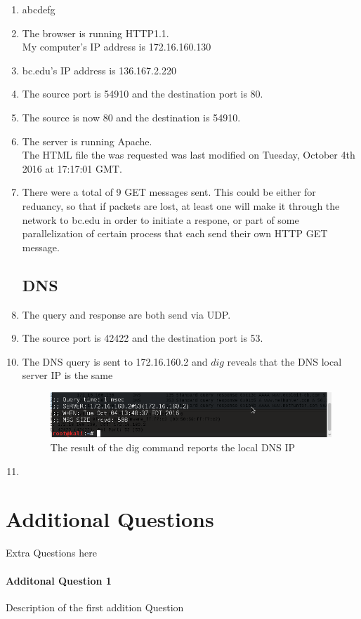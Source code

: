\documentclass[12pt]{article}
\begin{document}
\begin{enumerate}[label=\textbf{  Question \arabic*) }]
	\item abcdefg
	\item The browser is running HTTP1.1.\\ My computer's IP address is 172.16.160.130\\
	\item bc.edu's  IP address is 136.167.2.220\\
	\item The source port is 54910 and the destination port is 80.\\
	\item The source is now 80 and the destination is 54910. \\
	\item The server is running Apache.\\	The HTML file the was requested was last modified on Tuesday, October 4th 	2016 at 17:17:01 GMT.\\
	\item There were a total of 9 GET messages sent. This could be either for reduancy, so that if packets are lost, at least one will make it through the network to bc.edu in order to initiate a respone, or part of some parallelization of certain process that each send their own HTTP GET message.



\subsection{DNS}

	\item The query and response are both send via UDP.
	\item The source port is 42422 and the destination port is 53.
	\item The DNS query is sent to 172.16.160.2 and $dig$ reveals that the DNS local server IP is the same

	\begin{figure}[h]
		\caption{The result of the dig command reports the local DNS IP }
		\centering
		\includegraphics[scale = 0.75]{DNS_IP}
	\end{figure}

	\item

\end{enumerate}


\section{Additional Questions}
Extra Questions here

\paragraph{Additonal Question 1}
Description of the first addition Question
\end{document}
